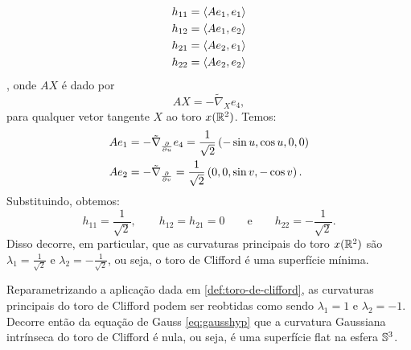 \begin{exemplo}
	\begin{align*}
		h_{11} &= \left\langle A e_1,e_1 \right\rangle\\
		h_{12} &= \left\langle A e_1,e_2 \right\rangle\\
		h_{21} &= \left\langle A e_2,e_1 \right\rangle\\
		h_{22} &= \left\langle A e_2,e_2 \right\rangle
	\end{align*},
	onde $AX$ é dado por
	\[ AX = -\tilde{\nabla}_X e_4, \]
	para qualquer vetor tangente $X$ ao toro $x(\mathbb{R}^2)$. Temos:
	\begin{align*}
		A e_1 &= -\tilde{\nabla}_{\frac{\partial}{\partial u}} e_4 = \frac{1}{\sqrt{2}} \left( -\sin u, \cos u, 0, 0 \right)\\
		A e_2 &= -\tilde{\nabla}_{\frac{\partial}{\partial v}} = \frac{1}{\sqrt{2}} \left( 0,0, \sin v, -\cos v \right).
	\end{align*}
	Substituindo, obtemos:
	\[ h_{11} = \frac{1}{\sqrt{2}}, \qquad h_{12}=h_{21}=0 \qquad \text{e} \qquad h_{22} = -\frac{1}{\sqrt{2}}. \]
	Disso decorre, em particular, que as curvaturas principais do toro $x(\mathbb{R}^2)$ são $\lambda_1 = \frac{1}{\sqrt{2}}$ e $\lambda_2 = -\frac{1}{\sqrt{2}}$, ou seja, o toro de Clifford é uma superfície mínima.
\end{exemplo}

\begin{observacao}
	Reparametrizando a aplicação dada em \eqref{def:toro-de-clifford}, as curvaturas principais do toro de Clifford podem ser reobtidas como sendo $\lambda_1=1$ e $\lambda_2=-1$. Decorre então da equação de Gauss \eqref{eq:gausshyp} que a curvatura Gaussiana intrínseca do toro de Clifford é nula, ou seja, é uma superfície flat na esfera $\mathbb{S}^3$.
\end{observacao}


